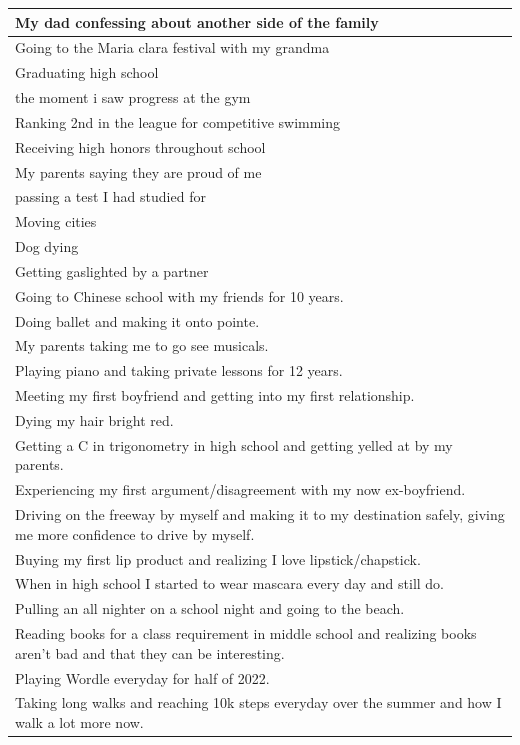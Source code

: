 \documentclass[
  .7em,
  letterpaper,
  DIV=11,
  numbers=noendperiod]{scrartcl}
\begin{document}
\begin{table}
\begin{tabular}{l}
\hline
My dad confessing about another side of the family\\
\hline
Going to the Maria clara festival with my grandma\\
\hline
Graduating high school\\
\hline
the moment i saw progress at the gym\\
\hline
Ranking 2nd in the league for competitive swimming\\
\hline
Receiving high honors throughout school\\
\hline
My parents saying they are proud of me\\
\hline
passing a test I had studied for\\
\hline
Moving cities\\
\hline
Dog dying\\
\hline
Getting gaslighted by a partner\\
\hline
Going to Chinese school with my friends for 10 years.\\
\hline
Doing ballet and making it onto pointe.\\
\hline
My parents taking me to go see musicals.\\
\hline
Playing piano and taking private lessons for 12 years.\\
\hline
Meeting my first boyfriend and getting into my first relationship.\\
\hline
Dying my hair bright red.\\
\hline
Getting a C in trigonometry in high school and getting yelled at by my parents.\\
\hline
Experiencing my first argument/disagreement with my now ex-boyfriend.\\
\hline
Driving on the freeway by myself and making it to my destination safely, giving me more confidence to drive by myself.\\
\hline
Buying my first lip product and realizing I love lipstick/chapstick.\\
\hline
When in high school I started to wear mascara every day and still do.\\
\hline
Pulling an all nighter on a school night and going to the beach.\\
\hline
Reading books for a class requirement in middle school and realizing books aren't bad and that they can be interesting.\\
\hline
Playing Wordle everyday for half of 2022.\\
\hline
Taking long walks and reaching 10k steps everyday over the summer and how I walk a lot more now.\\

\end{tabular}
\end{table}
\end{document}
